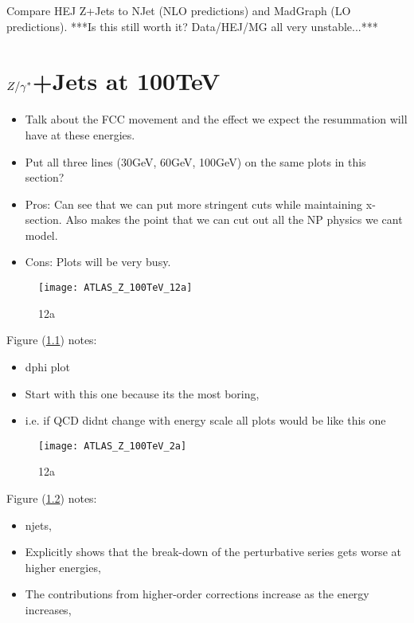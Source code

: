 Compare HEJ Z+Jets to NJet (NLO predictions) and MadGraph (LO predictions).  ***Is this still worth it? Data/HEJ/MG all very unstable...***

\chapter{$Z/\gamma^*$+Jets at 100TeV}
\label{chap:100TeV}

	\begin{itemize}
		\item Talk about the FCC movement and the effect we expect the resummation will have at these energies.
		\item Put all three lines (30GeV, 60GeV, 100GeV) on the same plots in this section?
		\item Pros: Can see that we can put more stringent cuts while maintaining x-section.  Also
		      makes the point that we can cut out all the NP physics we cant model.
		\item Cons: Plots will be very busy.
	\end{itemize}

	\begin{figure}[h]
		\centering
		\texttt{[image: ATLAS\_Z\_100TeV\_12a]}
		\caption{12a}
		\label{fig:100tev_12a}
	\end{figure}

	Figure (\ref{fig:100tev_12a}) notes:

	\begin{itemize}
		\item dphi plot
		\item Start with this one because its the most boring,
		\item i.e. if QCD didnt change with energy scale all plots would be like this one
	\end{itemize}

	\begin{figure}[h]
		\centering
		\texttt{[image: ATLAS\_Z\_100TeV\_2a]}
		\caption{12a}
		\label{fig:100tev_2a}
	\end{figure}

	Figure (\ref{fig:100tev_2a}) notes:

	\begin{itemize}
		\item njets,
		\item Explicitly shows that the break-down of the perturbative series gets worse at higher energies,
		\item The contributions from higher-order corrections increase as the energy increases,
	\end{itemize}


